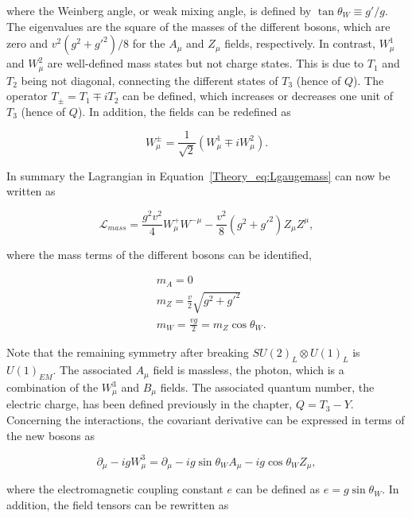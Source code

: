 where the Weinberg angle, or weak mixing angle, is defined by $\tan\theta_W\equiv g'/g$. The eigenvalues are the square of the masses of the different bosons, which are zero and $v^2(g^2+g'^2)/8$ for the $A_\mu$ and $Z_\mu$ fields, respectively. In contrast, $W_\mu^1$ and $W_\mu^2$ are well-defined mass states but not charge states. This is due to $T_1$ and $T_2$ being not diagonal, connecting the different states of $T_3$ (hence of $Q$). The operator $T_\pm=T_1\mp iT_2$ can be defined, which increases or decreases one unit of $T_3$ (hence of $Q$). In addition, the fields can be redefined as

\begin{equation}
    W_\mu^\pm = \frac{1}{\sqrt{2}}(W_\mu^1\mp i W_\mu^2).
\end{equation}

In summary the Lagrangian in Equation~\ref{Theory_eq:Lgaugemass} can now be written as

\begin{equation}
    \mathcal{L}_{mass} = \frac{g^2v^2}{4}W_\mu^+W^{- \mu} - \frac{v^2}{8}(g^2+g'^2)Z_\mu Z^\mu,
\end{equation}

where the mass terms of the different bosons can be identified,

\begin{equation}
\begin{split}
    &m_A = 0\\
    &m_Z = \frac{v}{2}\sqrt{g^2+g'^2}\\
    &m_W = \frac{vg}{2} = m_Z \cos\theta_W.
\end{split}
\end{equation}

Note that the remaining symmetry after breaking $SU(2)_L\otimes U(1)_L$ is $U(1)_{EM}$. The associated $A_\mu$ field is massless, the photon, which is a combination of the $W_\mu^3$ and $B_\mu$ fields. The associated quantum number, the electric charge, has been defined previously in the chapter, $Q = T_3-Y$.\\

Concerning the interactions, the covariant derivative can be expressed in terms of the new bosons as

\begin{equation}
    \partial_\mu - igW_\mu^3 = \partial_\mu - ig\sin\theta_W A_\mu - ig\cos\theta_W Z_\mu,
\end{equation}

where the electromagnetic coupling constant $e$ can be defined as $e=g\sin\theta_W$. In addition, the field tensors can be rewritten as

